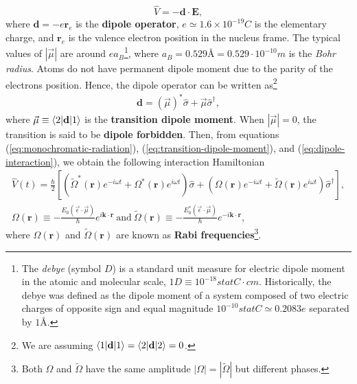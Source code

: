 \begin{equation}
	\hat{V} = - \mathbf{d} \cdot \mathbf{E},
	\label{eq:dipole-interaction}
\end{equation}
where $ \mathbf{d} = - e \mathbf{r}_e  $ is the \textbf{dipole operator}, $ e \simeq 1.6 \times 10^{-19}C $ is the elementary charge, and $ \mathbf{r}_e $ is the valence electron position in the nucleus frame. The typical values of $ |\vec{\mu}| $ are around $ ea_B $\footnote{The \textit{debye} (symbol $ D $) is a standard unit measure for electric dipole moment in the atomic and molecular scale, $ 1 D \equiv 10^{-18} statC \cdot cm $. Historically, the debye was defined as the dipole moment of a system composed of two electric charges of opposite sign and equal magnitude $ 10^{-10} statC \simeq 0.2083 e $ separated by $ 1 \textrm{\AA} $.}, where $ a_B = 0.529 \textrm{\AA} = 0.529 \cdot 10^{-10}m $ is the \textit{Bohr radius}. Atoms do not have permanent dipole moment due to the parity of the electrons position. Hence, the dipole operator can be written as\footnote{We are assuming $ \braket{1|\mathbf{d}|1} = \braket{2|\mathbf{d}|2} = 0 $.}
\begin{gather}
	\mathbf{d} = (\vec{\mu})^* \hat{\sigma} + \vec{\mu} \hat{\sigma}^{\dagger},
	\label{eq:transition-dipole-moment}
\end{gather}
where $ \vec{\mu} \equiv \braket{2|\mathbf{d}|1} $ is the \textbf{transition dipole moment}. When $ |\vec{\mu}| = 0 $, the transition is said to be \textbf{dipole forbidden}. Then, from equations (\ref{eq:monochromatic-radiation}), (\ref{eq:transition-dipole-moment}), and (\ref{eq:dipole-interaction}), we obtain the following interaction Hamiltonian
\begin{gather}
	\hat{V}(t) = \frac{\hbar}{2} [(\tilde{\Omega}^*(\mathbf{r}) e^{- i \omega t} + \Omega^{*}(\mathbf{r})e^{i \omega t})\hat{\sigma} + (\Omega(\mathbf{r}) e^{- i \omega t} + \tilde{\Omega}(\mathbf{r})e^{i \omega t})\hat{\sigma}^{\dagger}],
	\label{eq:full-interaction-Hamiltonian}
	\\
	\Omega(\mathbf{r}) \equiv -\frac{E_0(\vec{\epsilon} \cdot \vec{\mu})}{\hbar}e^{i\mathbf{k}\cdot\mathbf{r}}\ \textrm{and}\ \tilde{\Omega}(\mathbf{r}) \equiv -\frac{E_0^* (\vec{\epsilon} \cdot \vec{\mu})}{\hbar}e^{-i\mathbf{k}\cdot\mathbf{r}},
	\label{eq:Rabi-frequency}
\end{gather}
where $ \Omega(\mathbf{r}) $ and $ \tilde{\Omega}(\mathbf{r}) $ are known as \textbf{Rabi frequencies}\footnote{Both $ \Omega $ and $ \tilde{\Omega} $ have the same amplitude $ |\Omega| = |\tilde{\Omega}| $ but different phases.}. 


